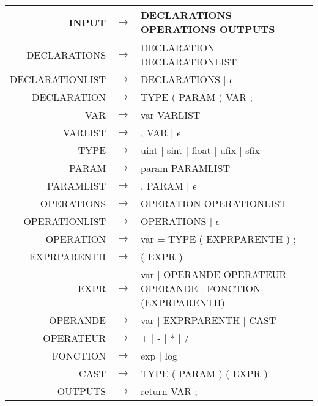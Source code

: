 \documentclass{article}
\begin{document}
\begin{tabular}{rll}
\noindent INPUT & $\rightarrow$ & DECLARATIONS OPERATIONS OUTPUTS\\
\hline
DECLARATIONS & $\rightarrow$ & DECLARATION DECLARATIONLIST\\
DECLARATIONLIST & $\rightarrow$ & DECLARATIONS | $\epsilon$\\
DECLARATION & $\rightarrow$ & TYPE ( PARAM ) VAR ;\\
VAR & $\rightarrow$ & var VARLIST\\
VARLIST & $\rightarrow$ & , VAR | $\epsilon$\\
TYPE & $\rightarrow$ & uint | sint | float | ufix | sfix\\
PARAM & $\rightarrow$ & param PARAMLIST\\
PARAMLIST & $\rightarrow$ & , PARAM | $\epsilon$\\
\hline
OPERATIONS & $\rightarrow$ & OPERATION OPERATIONLIST\\
OPERATIONLIST & $\rightarrow$ & OPERATIONS | $\epsilon$\\
OPERATION & $\rightarrow$ & var = TYPE ( EXPRPARENTH ) ;\\
EXPRPARENTH & $\rightarrow$ & ( EXPR )\\
EXPR & $\rightarrow$ & var | OPERANDE OPERATEUR OPERANDE | FONCTION (EXPRPARENTH)\\
OPERANDE & $\rightarrow$ & var | EXPRPARENTH | CAST\\
OPERATEUR & $\rightarrow$ & + | - | * | /\\
FONCTION & $\rightarrow$ & exp | log\\
CAST & $\rightarrow$ & TYPE ( PARAM ) ( EXPR )\\
\hline
OUTPUTS & $\rightarrow$ & return VAR ;\\
\end{tabular}
\end{document}
